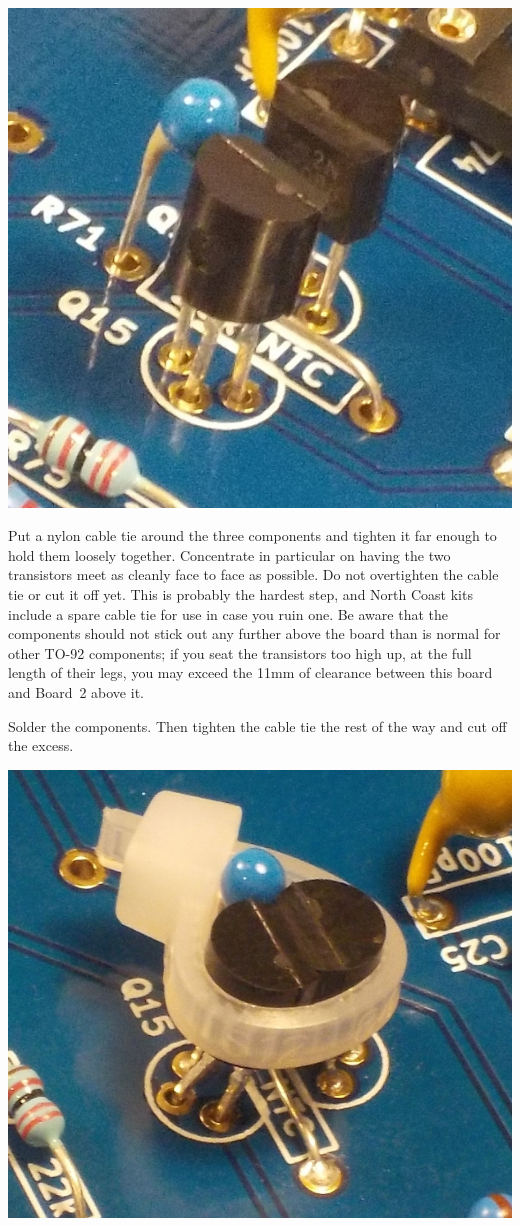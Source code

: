 \nopagebreak
\noindent\includegraphics[width=\linewidth]{expo-untied.jpg}

\pagebreak

Put a nylon cable tie around the three components and tighten it far enough
to hold them loosely together.  Concentrate in particular on having the two
transistors meet as cleanly face to face as possible.  Do not overtighten
the cable tie or cut it off yet.  This is probably the hardest step, and
North Coast kits include a spare cable tie for use in case you ruin one.  Be
aware that the components should not stick out any further above the board
than is normal for other TO-92 components; if you seat the transistors too
high up, at the full length of their legs, you may exceed the 11mm of
clearance between this board and Board~2 above it.

Solder the components.  Then tighten the cable tie the rest of the way and
cut off the excess.

\nopagebreak
\noindent\includegraphics[width=\linewidth]{expo-tied.jpg}

